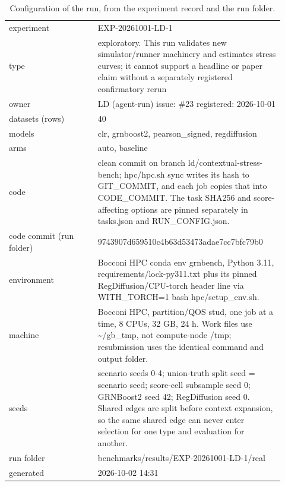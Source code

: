 \begin{table}[H]\centering\small
\caption{Configuration of the run, from the experiment record and the run folder.}
\begin{tabular}{p{0.3\linewidth}p{0.62\linewidth}}\toprule
experiment & EXP-20261001-LD-1 \\
type & exploratory. This run validates new simulator/runner machinery and estimates stress curves; it cannot support a headline or paper claim without a separately registered confirmatory rerun \\
owner & LD (agent-run)   issue: \#23   registered: 2026-10-01 \\
datasets (rows) & 40 \\
models & clr, grnboost2, pearson\_signed, regdiffusion \\
arms & auto, baseline \\
code & clean commit on branch ld/contextual-stress-bench; hpc/hpc.sh sync writes its hash to GIT\_COMMIT, and each job copies that into CODE\_COMMIT. The task SHA256 and score-affecting options are pinned separately in tasks.json and RUN\_CONFIG.json. \\
code commit (run folder) & 9743907d659510c4b63d53473adae7cc7bfc79b0 \\
environment & Bocconi HPC conda env grnbench, Python 3.11, requirements/lock-py311.txt plus its pinned RegDiffusion/CPU-torch header line via WITH\_TORCH=1 bash hpc/setup\_env.sh. \\
machine & Bocconi HPC, partition/QOS stud, one job at a time, 8 CPUs, 32 GB, 24 h. Work files use \textasciitilde{}/gb\_tmp, not compute-node /tmp; resubmission uses the identical command and output folder. \\
seeds & scenario seeds 0-4; union-truth split seed = scenario seed; score-cell subsample seed 0; GRNBoost2 seed 42; RegDiffusion seed 0. Shared edges are split before context expansion, so the same shared edge can never enter selection for one type and evaluation for another. \\
run folder & benchmarks/results/EXP-20261001-LD-1/real \\
generated & 2026-10-02 14:31 \\
\bottomrule\end{tabular}\end{table}
